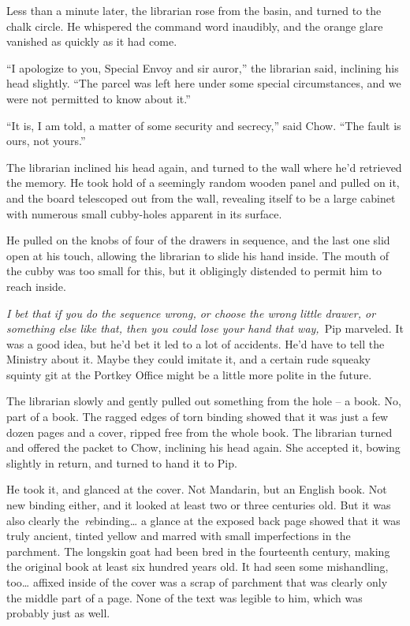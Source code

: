 Less than a minute later, the librarian rose from the basin, and turned
to the chalk circle. He whispered the command word inaudibly, and the
orange glare vanished as quickly as it had come.

``I apologize to you, Special Envoy and sir auror,'' the librarian said,
inclining his head slightly. ``The parcel was left here under some
special circumstances, and we were not permitted to know about it.''

``It is, I am told, a matter of some security and secrecy,'' said Chow.
``The fault is ours, not yours.''

The librarian inclined his head again, and turned to the wall where he'd
retrieved the memory. He took hold of a seemingly random wooden panel
and pulled on it, and the board telescoped out from the wall, revealing
itself to be a large cabinet with numerous small cubby-holes apparent in
its surface.

He pulled on the knobs of four of the drawers in sequence, and the last
one slid open at his touch, allowing the librarian to slide his hand
inside. The mouth of the cubby was too small for this, but it obligingly
distended to permit him to reach inside.

\emph{I bet that if you do the sequence wrong, or choose the wrong
little drawer, or something else like that, then you could lose your
hand that way,}~Pip marveled. It was a good idea, but he'd bet it led to
a lot of accidents. He'd have to tell the Ministry about it. Maybe they
could imitate it, and a certain rude squeaky squinty git at the Portkey
Office might be a little more polite in the future.

The librarian slowly and gently pulled out something from the hole -- a
book. No, part of a book. The ragged edges of torn binding showed that
it was just a few dozen pages and a cover, ripped free from the whole
book. The librarian turned and offered the packet to Chow, inclining his
head again. She accepted it, bowing slightly in return, and turned to
hand it to Pip.

He took it, and glanced at the cover. Not Mandarin, but an English book.
Not new binding either, and it looked at least two or three centuries
old. But it was also clearly the~\emph{re}binding\ldots{} a glance at
the exposed back page showed that it was truly ancient, tinted yellow
and marred with small imperfections in the parchment. The longskin goat
had been bred in the fourteenth century, making the original book at
least six hundred years old. It had seen some mishandling, too\ldots{}
affixed inside of the cover was a scrap of parchment that was clearly
only the middle part of a page. None of the text was legible to him,
which was probably just as well.

